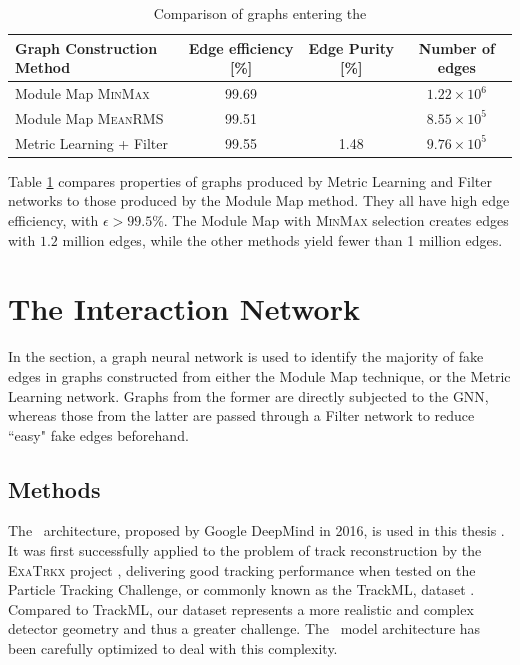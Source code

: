 \begin{table}[h!]
    \centering
    \begin{tabular}{l|c|c|c}
      Graph Construction Method  & Edge efficiency [\%] & Edge Purity [\%] & Number of edges  \\
      \hline \hline
        Module Map {\textsc{MinMax}} & 99.69 & & $1.22\times 10^6$ \\
        Module Map {\textsc{MeanRMS}} & 99.51  & & $8.55\times 10^5$ \\
        Metric Learning + Filter & 99.55  & 1.48 & $9.76\times 10^5$\\
        \hline
    \end{tabular}
    \caption{Comparison of graphs entering the \ignn}
    \label{tab:graph-contruction-comparison}
\end{table}

Table \ref{tab:graph-contruction-comparison} compares properties of graphs produced by Metric Learning and Filter networks to those produced by the Module Map method. 
They all have high edge efficiency, with $\epsilon> 99.5\%$. 
The Module Map with \textsc{MinMax} selection creates edges with $1.2$ million edges, while the other methods yield fewer than 1 million edges. 

\section{The Interaction Network}
\label{sect:ignn}

In the section, a graph neural network is used to identify the majority of fake edges in graphs constructed from either the Module Map technique, or the Metric Learning network.
Graphs from the former are directly subjected to the GNN, whereas those from the latter are passed through a Filter network to reduce ``easy" fake edges beforehand.

\subsection{Methods}

The \ignn~architecture, proposed by Google DeepMind in 2016, 
is used in this thesis \cite{interaction-gnn}. 
It was first successfully applied to the problem of track reconstruction by the \textsc{ExaTrkx} project \cite{exatrkx}, delivering good tracking performance when tested on the Particle Tracking Challenge, or commonly known as the TrackML, dataset \cite{trackml-particle-identification}.
Compared to TrackML, our dataset represents a more realistic and complex detector geometry and thus a greater challenge. 
The \ignn~model architecture has been carefully optimized to deal with this complexity. 

